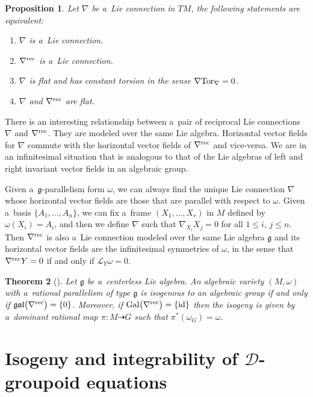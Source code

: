 \documentclass[pdftex]{sigma}
\numberwithin{equation}{section}
\newtheorem{Theorem}{Theorem}[section]
\newtheorem{Proposition}[Theorem]{Proposition}
\theoremstyle{definition}
\begin{document}
\begin{Proposition}
Let $\nabla$ be a~Lie connection in $TM$, the following statements are equivalent:
\begin{enumerate}\itemsep=0pt
 \item[$(1)$] $\nabla$ is a~Lie connection.
 \item[$(2)$] $\nabla^{\rm rec}$ is a~Lie connection.
 \item[$(3)$] $\nabla$ is flat and has constant torsion in the sense $\nabla {\rm Tor}_\nabla = 0$.
 \item[$(4)$] $\nabla$ and $\nabla^{\rm rec}$ are flat.
\end{enumerate}
\end{Proposition}

There is an interesting relationship between a~pair of reciprocal Lie connections $\nabla$ and $\nabla^{\rm rec}$. They are modeled over the same Lie algebra. Horizontal vector fields for $\nabla$ commute with the horizontal vector fields of $\nabla^{\rm rec}$ and vice-versa. We are in an infinitesimal situation that is analogous to that of the Lie algebras of left and right invariant vector fields in an algebraic group.

Given a~$\mathfrak g$-parallelism form $\omega$, we can always find the unique Lie connection $\nabla$ whose horizontal vector fields are those that are parallel with respect to $\omega$. Given a~basis $\{A_1,\dots,A_n\}$, we can fix a~frame $(X_1,\dots,X_r)$ in $M$ defined by $\omega(X_i)=A_i$, and then we define $\nabla$ such that $\nabla_{X_i}X_j = 0$ for all $1 \leq i$, $j \leq n$.
Then $\nabla^{\rm rec}$ is also a~Lie connection modeled over the same Lie algebra $\mathfrak g$ and its horizontal vector fields are the infinitesimal symmetries of $\omega$, in the sense that $\nabla^{\rm rec} Y = 0$ if and only if $\mathcal{L}_Y\omega = 0$.

\begin{Theorem}[{\cite[Corollary 4.3\,(a) and (d)]{bc2017}}]\label{thm:0}
Let $\mathfrak g$ be a~centerless Lie algebra. An algebraic variety $(M,\omega)$ with a~rational parallelism of type $\mathfrak g$ is isogenous to an algebraic group if and only if $\mathfrak{gal}\bigl(\nabla^{\rm rec}\bigr) = \{0\}$. Moreover, if ${\rm Gal}\bigl(\nabla^{\rm rec}\bigr) = \{ \rm id \}$ then the isogeny is given by a~dominant rational map $\pi\colon M \dasharrow G$ such that $\pi^*(\omega_G) = \omega$.
\end{Theorem}

\section[Isogeny and integrability of D-groupoid equations]{Isogeny and integrability of $\boldsymbol{\mathcal D}$-groupoid equations}
\end{document}
